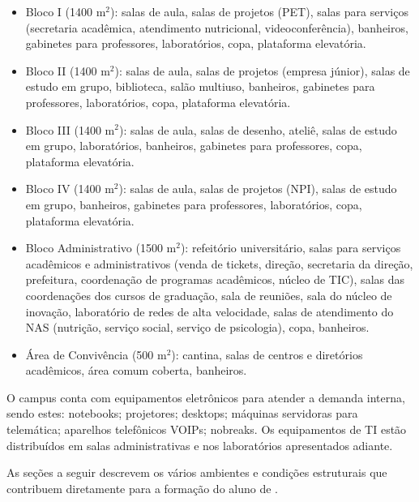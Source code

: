 \begin{itemize}
    \item Bloco I (1400 m$^2$): salas de aula, salas de projetos (PET), salas para serviços (secretaria acadêmica, atendimento nutricional, videoconferência), banheiros, gabinetes para professores, laboratórios, copa, plataforma elevatória.

    \item Bloco II (1400 m$^2$): salas de aula, salas de projetos (empresa júnior), salas de estudo em grupo, biblioteca, salão multiuso, banheiros, gabinetes para professores, laboratórios, copa, plataforma elevatória.

    \item Bloco III (1400 m$^2$): salas de aula, salas de desenho, ateliê, salas de estudo em grupo, laboratórios, banheiros, gabinetes para professores, copa, plataforma elevatória.

    \item Bloco IV (1400 m$^2$): salas de aula, salas de projetos (NPI), salas de estudo em grupo, banheiros, gabinetes para professores, laboratórios, copa, plataforma elevatória.

    \item Bloco Administrativo (1500 m$^2$): refeitório universitário, salas para serviços acadêmicos e administrativos (venda de tickets, direção, secretaria da direção, prefeitura, coordenação de programas acadêmicos, núcleo de TIC), salas das coordenações dos cursos de graduação, sala de reuniões, sala do núcleo de inovação, laboratório de redes de alta velocidade, salas de atendimento do NAS (nutrição, serviço social, serviço de psicologia), copa, banheiros.

    \item Área de Convivência (500 m$^2$): cantina, salas de centros e diretórios acadêmicos, área comum coberta, banheiros.
\end{itemize}

O campus conta com \ufcNumEquipEletro equipamentos eletrônicos para atender a demanda interna, sendo estes: \ufcNumNotebooks notebooks; \ufcNumProjetores projetores; \ufcNumDesktops desktops; \ufcNumServidores máquinas servidoras para telemática; \ufcNumVoip aparelhos telefônicos VOIPs; \ufcNumNobreaks nobreaks. Os equipamentos de TI estão distribuídos em salas administrativas e nos laboratórios apresentados adiante.

As seções a seguir descrevem os vários ambientes e condições estruturais que contribuem diretamente para a formação do aluno de \nomedocurso.

